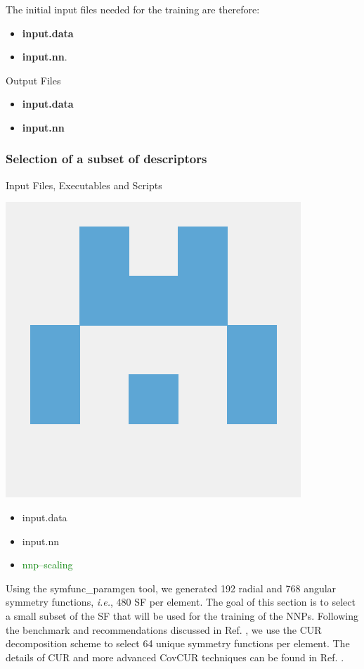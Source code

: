 \documentclass[12pt]{article}
\begin{document}
The initial input files needed for the training are therefore:
\begin{itemize}
    \item \textbf{input.data}
    \item \textbf{input.nn}.
\end{itemize}

\begin{mybox3}{Output Files}
\begin{itemize}
    \item \textbf{input.data}
    \item \textbf{input.nn} 
\end{itemize}
\end{mybox3}

\subsubsection{Selection of a subset of descriptors}
\begin{mybox2}{{Input Files, Executables and Scripts}}
\begin{minipage}[c]{0.5\linewidth}
\includegraphics[scale=0.1]{latex_files/n2p2.png}
\end{minipage}
\begin{minipage}[c]{0.5\linewidth}
\begin{itemize}
    \item input.data
    \item input.nn
    \item \textcolor{green}{nnp--scaling}
\end{itemize}
\end{minipage}
\end{mybox2}
Using the symfunc\_paramgen tool, we generated 192 radial and 768 angular symmetry functions, \textit{i.e.}, 480 SF per element. The goal of this section is to select a small subset of the SF that will be used for the training of the NNPs. Following the benchmark and recommendations discussed in Ref. , we use the CUR decomposition scheme to select 64 unique symmetry functions per element. The details of CUR and more advanced CovCUR techniques can be found in Ref. . 
\end{document}
